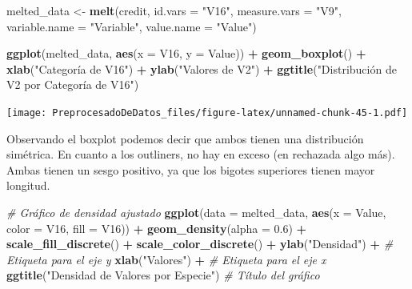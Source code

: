 \documentclass[
]{article}
\newenvironment{Shaded}{\begin{snugshade}}{\end{snugshade}}
\newcommand{\AttributeTok}[1]{\textcolor[rgb]{0.13,0.29,0.53}{#1}}
\newcommand{\CommentTok}[1]{\textcolor[rgb]{0.56,0.35,0.01}{\textit{#1}}}
\newcommand{\FloatTok}[1]{\textcolor[rgb]{0.00,0.00,0.81}{#1}}
\newcommand{\FunctionTok}[1]{\textcolor[rgb]{0.13,0.29,0.53}{\textbf{#1}}}
\newcommand{\NormalTok}[1]{#1}
\newcommand{\OtherTok}[1]{\textcolor[rgb]{0.56,0.35,0.01}{#1}}
\newcommand{\SpecialCharTok}[1]{\textcolor[rgb]{0.81,0.36,0.00}{\textbf{#1}}}
\newcommand{\StringTok}[1]{\textcolor[rgb]{0.31,0.60,0.02}{#1}}
\begin{document}
\begin{Shaded}
\begin{Highlighting}[]
\NormalTok{melted\_data }\OtherTok{\textless{}{-}} \FunctionTok{melt}\NormalTok{(credit, }\AttributeTok{id.vars =} \StringTok{"V16"}\NormalTok{, }\AttributeTok{measure.vars =} \StringTok{"V9"}\NormalTok{, }\AttributeTok{variable.name =} \StringTok{"Variable"}\NormalTok{, }\AttributeTok{value.name =} \StringTok{"Value"}\NormalTok{)}

\FunctionTok{ggplot}\NormalTok{(melted\_data, }\FunctionTok{aes}\NormalTok{(}\AttributeTok{x =}\NormalTok{ V16, }\AttributeTok{y =}\NormalTok{ Value)) }\SpecialCharTok{+}
  \FunctionTok{geom\_boxplot}\NormalTok{() }\SpecialCharTok{+}
  \FunctionTok{xlab}\NormalTok{(}\StringTok{"Categoría de V16"}\NormalTok{) }\SpecialCharTok{+}
  \FunctionTok{ylab}\NormalTok{(}\StringTok{"Valores de V2"}\NormalTok{) }\SpecialCharTok{+}
  \FunctionTok{ggtitle}\NormalTok{(}\StringTok{"Distribución de V2 por Categoría de V16"}\NormalTok{)}
\end{Highlighting}
\end{Shaded}

\texttt{[image: PreprocesadoDeDatos\_files/figure-latex/unnamed-chunk-45-1.pdf]}

Observando el boxplot podemos decir que ambos tienen una distribución
simétrica. En cuanto a los outliners, no hay en exceso (en rechazada
algo más). Ambas tienen un sesgo positivo, ya que los bigotes superiores
tienen mayor longitud.

\begin{Shaded}
\begin{Highlighting}[]
\CommentTok{\# Gráfico de densidad ajustado}
\FunctionTok{ggplot}\NormalTok{(}\AttributeTok{data =}\NormalTok{ melted\_data, }\FunctionTok{aes}\NormalTok{(}\AttributeTok{x =}\NormalTok{ Value, }\AttributeTok{color =}\NormalTok{ V16, }\AttributeTok{fill =}\NormalTok{ V16)) }\SpecialCharTok{+}
  \FunctionTok{geom\_density}\NormalTok{(}\AttributeTok{alpha =} \FloatTok{0.6}\NormalTok{) }\SpecialCharTok{+}
  \FunctionTok{scale\_fill\_discrete}\NormalTok{() }\SpecialCharTok{+}
  \FunctionTok{scale\_color\_discrete}\NormalTok{() }\SpecialCharTok{+}
  \FunctionTok{ylab}\NormalTok{(}\StringTok{"Densidad"}\NormalTok{) }\SpecialCharTok{+}  \CommentTok{\# Etiqueta para el eje y}
  \FunctionTok{xlab}\NormalTok{(}\StringTok{"Valores"}\NormalTok{) }\SpecialCharTok{+}   \CommentTok{\# Etiqueta para el eje x}
  \FunctionTok{ggtitle}\NormalTok{(}\StringTok{"Densidad de Valores por Especie"}\NormalTok{)  }\CommentTok{\# Título del gráfico}
\end{Highlighting}
\end{Shaded}
\end{document}
